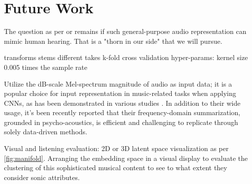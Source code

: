 \chapter{Future Work}

The question as per \cite{Turian2022HEAR:Representations} or \cite{Li2023MERT:Training} remains if such general-purpose audio representation can mimic human hearing. That is a "thorn in our side" that we will pursue.

transforms
stems
different takes
k-fold cross validation
hyper-params: kernel size 0.005 times the sample rate

Utilize the dB-scale Mel-spectrum magnitude of audio as input data; it is a popular choice for input representation in music-related tasks when applying CNNs, as has been demonstrated in various studies \cite{Kim2020OneStrategies}. In addition to their wide usage, it's been recently reported that their frequency-domain summarization, grounded in psycho-acoustics, is efficient and challenging to replicate through solely data-driven methods. \cite{Kim2020OneStrategies}

Visual and listening evaluation: 2D or 3D latent space visualization as per \ref{fig:manifold}. Arranging the embedding space in a visual display to evaluate the clustering of this sophisticated musical content to see to what extent they consider sonic attributes. 



\newpage